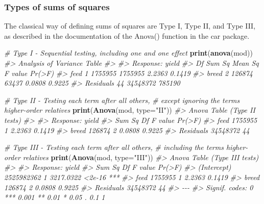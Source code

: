 \documentclass[
]{article}
\newenvironment{Shaded}{\begin{snugshade}}{\end{snugshade}}
\newcommand{\AttributeTok}[1]{\textcolor[rgb]{0.13,0.29,0.53}{#1}}
\newcommand{\CommentTok}[1]{\textcolor[rgb]{0.56,0.35,0.01}{\textit{#1}}}
\newcommand{\FunctionTok}[1]{\textcolor[rgb]{0.13,0.29,0.53}{\textbf{#1}}}
\newcommand{\NormalTok}[1]{#1}
\newcommand{\StringTok}[1]{\textcolor[rgb]{0.31,0.60,0.02}{#1}}
\begin{document}
\subsubsection{Types of sums of squares}\label{types-of-sums-of-squares}

The classical way of defining sums of squares are Type I, Type II, and
Type III, as described in the documentation of the Anova() function in
the car package.

\begin{Shaded}
\begin{Highlighting}[]
\CommentTok{\# Type I {-} Sequential testing, including one and one effect}
\FunctionTok{print}\NormalTok{(}\FunctionTok{anova}\NormalTok{(mod))}
\CommentTok{\#\textgreater{} Analysis of Variance Table}
\CommentTok{\#\textgreater{} }
\CommentTok{\#\textgreater{} Response: yield}
\CommentTok{\#\textgreater{}           Df   Sum Sq Mean Sq F value Pr(\textgreater{}F)}
\CommentTok{\#\textgreater{} feed       1  1755955 1755955  2.2363 0.1419}
\CommentTok{\#\textgreater{} breed      2   126874   63437  0.0808 0.9225}
\CommentTok{\#\textgreater{} Residuals 44 34548372  785190}

\CommentTok{\# Type II {-} Testing each term after all others, }
\CommentTok{\# except ignoring the term\textquotesingle{}s higher{-}order relatives}
\FunctionTok{print}\NormalTok{(}\FunctionTok{Anova}\NormalTok{(mod, }\AttributeTok{type=}\StringTok{"II"}\NormalTok{))}
\CommentTok{\#\textgreater{} Anova Table (Type II tests)}
\CommentTok{\#\textgreater{} }
\CommentTok{\#\textgreater{} Response: yield}
\CommentTok{\#\textgreater{}             Sum Sq Df F value Pr(\textgreater{}F)}
\CommentTok{\#\textgreater{} feed       1755955  1  2.2363 0.1419}
\CommentTok{\#\textgreater{} breed       126874  2  0.0808 0.9225}
\CommentTok{\#\textgreater{} Residuals 34548372 44}

\CommentTok{\# Type III {-} Testing each term after all others,}
\CommentTok{\# including the term\textquotesingle{}s higher{-}order relatives}
\FunctionTok{print}\NormalTok{(}\FunctionTok{Anova}\NormalTok{(mod, }\AttributeTok{type=}\StringTok{"III"}\NormalTok{))}
\CommentTok{\#\textgreater{} Anova Table (Type III tests)}
\CommentTok{\#\textgreater{} }
\CommentTok{\#\textgreater{} Response: yield}
\CommentTok{\#\textgreater{}                 Sum Sq Df   F value Pr(\textgreater{}F)    }
\CommentTok{\#\textgreater{} (Intercept) 2525982362  1 3217.0322 \textless{}2e{-}16 ***}
\CommentTok{\#\textgreater{} feed           1755955  1    2.2363 0.1419    }
\CommentTok{\#\textgreater{} breed           126874  2    0.0808 0.9225    }
\CommentTok{\#\textgreater{} Residuals     34548372 44                     }
\CommentTok{\#\textgreater{} {-}{-}{-}}
\CommentTok{\#\textgreater{} Signif. codes:  0 \textquotesingle{}***\textquotesingle{} 0.001 \textquotesingle{}**\textquotesingle{} 0.01 \textquotesingle{}*\textquotesingle{} 0.05 \textquotesingle{}.\textquotesingle{} 0.1 \textquotesingle{} \textquotesingle{} 1}
\end{Highlighting}
\end{Shaded}
\end{document}
